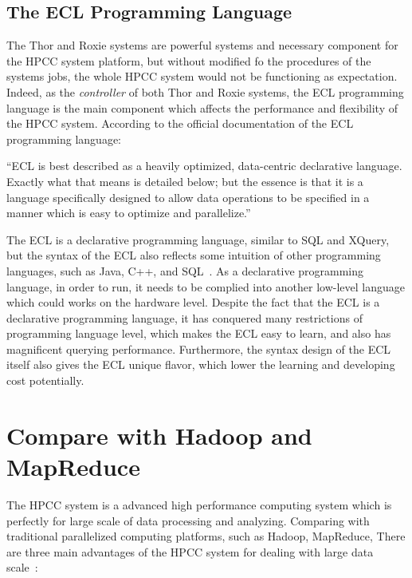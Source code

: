 \subsection{The ECL Programming Language}

The Thor and Roxie systems are powerful systems and necessary component for the HPCC system platform, but without modified fo the procedures of the systems jobs, the whole HPCC system would not be functioning as expectation. Indeed, as the \textit{controller} of both Thor and Roxie systems, the ECL programming language is the main component which affects the performance and flexibility of the HPCC system. According to the official documentation of the ECL programming language:

``ECL is best described as a heavily optimized, data-centric declarative language. Exactly
what that means is detailed below; but the essence is that it is a language specifically designed to allow data
operations to be specified in a manner which is easy to optimize and parallelize.''~\cite{ECL}


The ECL is a declarative programming language, similar to SQL and XQuery, but the syntax of the ECL also reflects some intuition of other programming languages, such as Java, C++, and SQL~\cite{ECL}. As a declarative programming language, in order to run, it needs to be complied into another low-level language which could works on the hardware level. Despite the fact that the ECL is a declarative programming language, it has conquered many restrictions of programming language level, which makes the ECL easy to learn, and also has magnificent querying performance. Furthermore, the syntax design of the ECL itself also gives the ECL unique flavor, which lower the learning and developing cost potentially. ~\cite{ECL}

\section{Compare with Hadoop and MapReduce}

The HPCC system is a advanced high performance computing system which is perfectly for large scale of data processing and analyzing. Comparing with traditional parallelized computing platforms, such as Hadoop, MapReduce, There are three main advantages of the HPCC system for dealing with large data scale~\cite{Intro4}:

